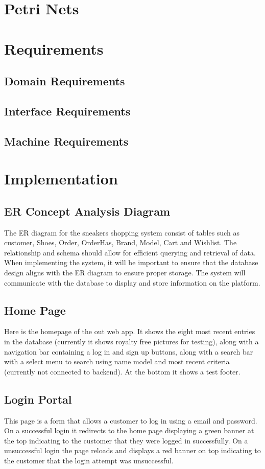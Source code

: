 \section{Petri Nets}
\section{Requirements}
\subsection{Domain Requirements}
\subsection{Interface Requirements}
\subsection{Machine Requirements}
\section{Implementation}
\subsection{ER Concept Analysis Diagram}
\hspace{1cm} The ER diagram for the sneakers shopping system consist of tables such as customer, Shoes, Order,
OrderHas, Brand, Model, Cart and Wishlist. The relationship and schema should allow for efficient
querying and retrieval of data. When implementing the system, it will be important to ensure that the
database design aligns with the ER diagram to ensure proper storage. The system will communicate with
the database to display and store information on the platform.
\subsection{Home Page}
Here is the homepage of the out web app. It shows the eight most recent entries in the database (currently it shows royalty free pictures for testing), along with a navigation bar containing a log in and sign up buttons, along with a search bar with a select menu to search using name model and most recent criteria (currently not connected to backend). At the bottom it shows a test footer.
\subsection{Login Portal}
This page is a form that allows a customer to log in using a email and password. On a successful login it redirects to the home page displaying a green banner at the top indicating to the customer that they were logged in successfully. On a unsuccessful login the page reloads and displays a red banner on top indicating to the customer that the login attempt was unsuccessful.
